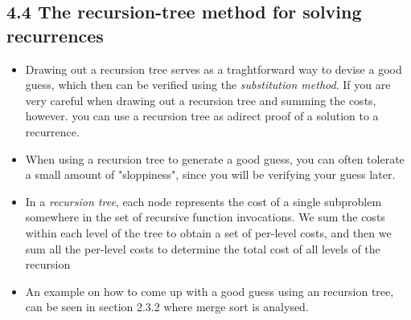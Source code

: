 \documentclass{report}
\begin{document}
\subsection*{4.4 The recursion-tree method for solving recurrences}
\begin{itemize}
    \item Drawing out a recursion tree serves as a traghtforward way to devise a good guess, which then can be verified using the \textit{substitution method}. If you are very careful when drawing out a recursion tree and summing the costs, however. you can use a recursion tree as adirect proof of a solution to a recurrence.
    \item When using a recursion tree to generate a good guess, you can often tolerate a small amount of "sloppiness", since you will be verifying your guess later. 
    \item In a \textit{recursion tree}, each node represents the cost of a single subproblem somewhere in the set of recursive function invocations. We sum the costs within each level of the tree to obtain a set of per-level costs, and then we sum all the per-level costs to determine the total cost of all levels of the recursion
    \item An example on how to come up with a good guess using an recursion tree, can be seen in section 2.3.2 where merge sort is analysed.
\end{itemize}
\end{document}
